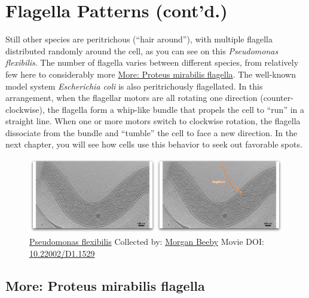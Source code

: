 \documentclass[]{tufte-book}
\begin{document}
\section{Flagella Patterns (cont'd.)}\label{flagella-patterns-contd.}

Still other species are peritrichous (``hair around''), with multiple
flagella distributed randomly around the cell, as you can see on this
\emph{Pseudomonas flexibilis}. The number of flagella varies between
different species, from relatively few here to considerably more
\protect\hyperlink{Proteus_mirabilis_flagella}{More: Proteus mirabilis
flagella}. The well-known model system \emph{Escherichia coli} is also
peritrichously flagellated. In this arrangement, when the flagellar
motors are all rotating one direction (counter-clockwise), the flagella
form a whip-like bundle that propels the cell to ``run'' in a straight
line. When one or more motors switch to clockwise rotation, the flagella
dissociate from the bundle and ``tumble'' the cell to face a new
direction. In the next chapter, you will see how cells use this behavior
to seek out favorable spots.





\begin{figure}
\includegraphics{movie_stills/6_5} \caption[\protect\hyperlink{tree}{Pseudomonas flexibilis} Collected by:
\protect\hyperlink{morgan_beeby}{Morgan Beeby} Movie DOI:
\href{https://doi.org/10.22002/D1.1529}{10.22002/D1.1529}]{\protect\hyperlink{tree}{Pseudomonas flexibilis} Collected by:
\protect\hyperlink{morgan_beeby}{Morgan Beeby} Movie DOI:
\href{https://doi.org/10.22002/D1.1529}{10.22002/D1.1529}}\label{fig:6-5}
\end{figure}

\hypertarget{Proteus_mirabilis_flagella}{\subsection*{More: Proteus
mirabilis flagella}\label{Proteus_mirabilis_flagella}}
\end{document}
